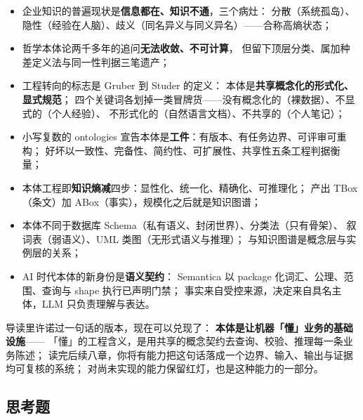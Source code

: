 \begin{itemize}
\item 企业知识的普遍现状是\textbf{信息都在、知识不通}，三个病灶：
      分散（系统孤岛）、隐性（经验在人脑）、歧义（同名异义与同义异名）——合称高熵状态；
\item 哲学本体论两千多年的追问\textbf{无法收敛、不可计算}，
      但留下顶层分类、属加种差定义法与同一性判据三笔遗产；
\item 工程转向的标志是 Gruber 到 Studer 的定义：
      本体是\textbf{共享概念化的形式化、显式规范}；
      四个关键词各划掉一类冒牌货——没有概念化的（裸数据）、不显式的（个人经验）、
      不形式化的（自然语言文档）、不共享的（个人笔记）；
\item 小写复数的 ontologies 宣告本体是\textbf{工件}：有版本、有任务边界、可评审可重构；
      好坏以一致性、完备性、简约性、可扩展性、共享性五条工程判据衡量；
\item 本体工程即\textbf{知识熵减}四步：显性化、统一化、精确化、可推理化；
      产出 TBox（条文）加 ABox（事实），规模化之后就是知识图谱；
\item 本体不同于数据库 Schema（私有语义、封闭世界）、分类法（只有骨架）、
      叙词表（弱语义）、UML 类图（无形式语义与推理）；
      与知识图谱是概念层与实例层的关系；
\item AI 时代本体的新身份是\textbf{语义契约}：
      Semantica 以 package 化词汇、公理、范围、查询与 shape 执行已声明门禁；
      事实来自受控来源，决定来自具名主体，LLM 只负责理解与表达。
\end{itemize}

导读里许诺过一句话的版本，现在可以兑现了：
\textbf{本体是让机器「懂」业务的基础设施}——
「懂」的工程含义，是用共享的概念契约去查询、校验、推理每一条业务陈述；
读完后续八章，你将有能力把这句话落成一个边界、输入、输出与证据均可复核的系统；
对尚未实现的能力保留红灯，也是这种能力的一部分。

\subsection{思考题}


